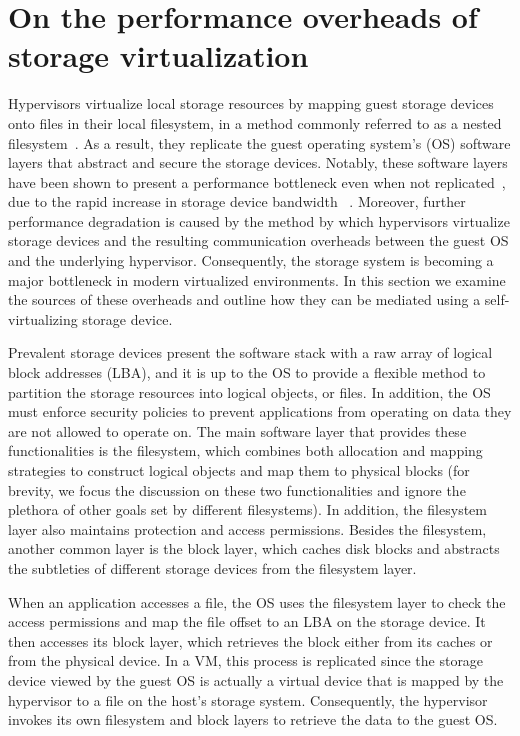 \section{On the performance overheads of storage virtualization}
\label{sec:motiv}

Hypervisors virtualize local storage resources by mapping guest storage devices onto files in their local filesystem, in a method commonly referred to as a nested filesystem~\cite{le12nested}. As a result, they replicate the guest operating system's (OS) software layers that abstract and secure the storage devices. Notably, these software layers have been shown to present a performance bottleneck even when not replicated~\cite{yu14swoverheads}, due to the rapid increase in storage device bandwidth ~\cite{intel-ssd,seagate16ssd}.
%
Moreover, further performance degradation is caused by the method by which hypervisors virtualize storage devices and the resulting communication overheads between the guest OS and the underlying hypervisor.
Consequently, the storage system is becoming a major bottleneck in modern virtualized environments.
%
In this section we examine the sources of these overheads and outline how they can be mediated using a self-virtualizing storage device.

Prevalent storage devices present the software stack with a raw array of logical block addresses (LBA), and it is up to the OS to provide a flexible method to partition the storage resources into logical objects, or files. In addition, the OS must enforce security policies to prevent applications from operating on data they are not allowed to operate on.
%
The main software layer that provides these functionalities is the filesystem, which combines both allocation and mapping strategies to construct logical objects and map them to physical blocks (for brevity, we focus the discussion on these two functionalities and ignore the plethora of other goals set by different filesystems). In addition, the filesystem layer also maintains protection and access permissions. Besides the filesystem, another common layer is the block layer, which caches disk blocks and abstracts the subtleties of different storage devices from the filesystem layer.

When an application accesses a file, the OS uses the filesystem layer to check the access permissions and map the file offset to an LBA on the storage device. It then accesses its block layer, which retrieves the block either from its caches or from the physical device. In a VM, this process is replicated since the storage device viewed by the guest OS is actually a virtual device that is mapped by the hypervisor to a file on the host's storage system. Consequently, the hypervisor invokes its own filesystem and block layers to retrieve the data to the guest OS. 

